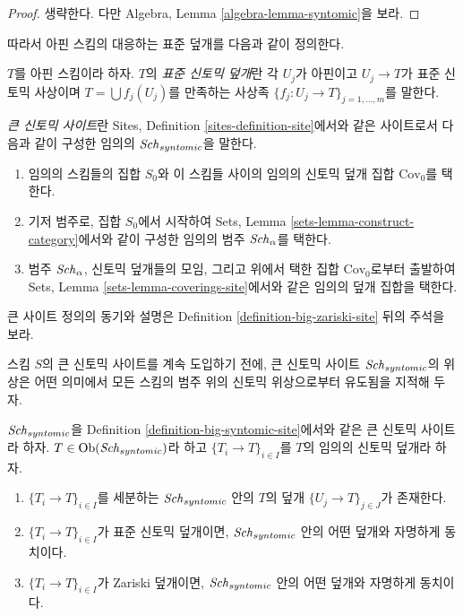 \begin{proof}
생략한다. 다만 Algebra, Lemma \ref{algebra-lemma-syntomic}을 보라.
\end{proof}

\noindent
따라서 아핀 스킴의 대응하는 표준 덮개를 다음과 같이 정의한다.

\begin{definition}
\label{definition-standard-syntomic}
$T$를 아핀 스킴이라 하자. $T$의 {\it 표준 신토믹 덮개}란 각 $U_j$가
아핀이고 $U_j \to T$가 표준 신토믹 사상이며
$T = \bigcup f_j(U_j)$를 만족하는 사상족
$\{f_j : U_j \to T\}_{j = 1, \ldots, m}$를 말한다.
\end{definition}

\begin{definition}
\label{definition-big-syntomic-site}
{\it 큰 신토믹 사이트}란 Sites, Definition
\ref{sites-definition-site}에서와 같은 사이트로서 다음과 같이 구성한
임의의 $\mathit{Sch}_{syntomic}$을 말한다.
\begin{enumerate}
\item 임의의 스킴들의 집합 $S_0$와 이 스킴들 사이의 임의의 신토믹
덮개 집합 $\text{Cov}_0$를 택한다.
\item 기저 범주로, 집합 $S_0$에서 시작하여 Sets, Lemma
\ref{sets-lemma-construct-category}에서와 같이 구성한 임의의 범주
$\mathit{Sch}_\alpha$를 택한다.
\item 범주 $\mathit{Sch}_\alpha$, 신토믹 덮개들의 모임, 그리고 위에서 택한
집합 $\text{Cov}_0$로부터 출발하여 Sets, Lemma
\ref{sets-lemma-coverings-site}에서와 같은 임의의 덮개 집합을 택한다.
\end{enumerate}
\end{definition}

\noindent
큰 사이트 정의의 동기와 설명은 Definition
\ref{definition-big-zariski-site} 뒤의 주석을 보라.

\medskip\noindent
스킴 $S$의 큰 신토믹 사이트를 계속 도입하기 전에, 큰 신토믹 사이트
$\mathit{Sch}_{syntomic}$의 위상은 어떤 의미에서 모든 스킴의 범주 위의 신토믹
위상으로부터 유도됨을 지적해 두자.

\begin{lemma}
\label{lemma-syntomic-induced}
$\mathit{Sch}_{syntomic}$을 Definition \ref{definition-big-syntomic-site}에서와
같은 큰 신토믹 사이트라 하자. $T \in \mathop{\mathrm{Ob}}\nolimits(\mathit{Sch}_{syntomic})$라 하고
$\{T_i \to T\}_{i \in I}$를 $T$의 임의의 신토믹 덮개라 하자.
\begin{enumerate}
\item $\{T_i \to T\}_{i \in I}$를 세분하는 $\mathit{Sch}_{syntomic}$ 안의 $T$의
덮개 $\{U_j \to T\}_{j \in J}$가 존재한다.
\item $\{T_i \to T\}_{i \in I}$가 표준 신토믹 덮개이면,
$\mathit{Sch}_{syntomic}$ 안의 어떤 덮개와 자명하게 동치이다.
\item $\{T_i \to T\}_{i \in I}$가 Zariski 덮개이면,
$\mathit{Sch}_{syntomic}$ 안의 어떤 덮개와 자명하게 동치이다.
\end{enumerate}
\end{lemma}

